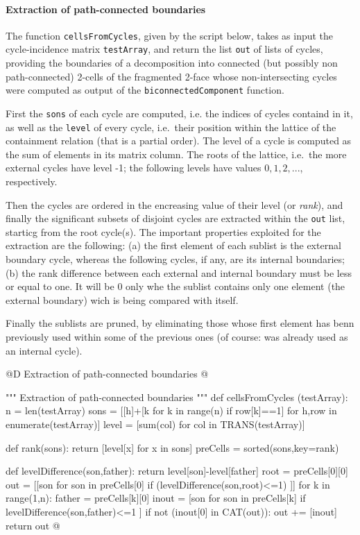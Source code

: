 \documentclass[11pt,oneside]{article}	%
\begin{document}
\paragraph{Extraction of path-connected boundaries}

The function \texttt{cellsFromCycles}, given by the script below, takes as input the cycle-incidence matrix \texttt{testArray}, and return the list \texttt{out} of lists of cycles, providing the boundaries of a decomposition into connected (but possibly non path-connected) 2-cells of the fragmented 2-face whose non-intersecting cycles were computed as output of the \texttt{biconnectedComponent} function. 

First the \texttt{sons} of each cycle are computed, i.e. the indices of cycles containd in it, as well as the \texttt{level} of every cycle, i.e.~their position within the lattice of the containment relation (that is a partial order). 
The level of a cycle is computed as the sum of elements in its matrix column. The roots of the lattice, i.e.~the more external cycles have level -1; the following levels have values $0,1,2,...$, respectively.

Then the cycles are ordered in the encreasing value of their level (or \emph{rank}), and finally the significant subsets of disjoint cycles are extracted within the \texttt{out} list, starticg from the root cycle(s). The important properties exploited for the extraction are the following: (a) the first element of each sublist is the external boundary cycle, whereas the following cycles, if any, are its internal boundaries; (b) the rank difference between each external and internal boundary must be less or equal to one. It will be 0 only whe the sublist contains only one element (the external boundary) wich is being compared with itself.

Finally the sublists are pruned, by eliminating those whose first element has benn previously used within some of the previous ones (of course: was already used as an internal cycle).

@D Extraction of path-connected boundaries
@{""" Extraction of path-connected boundaries """
def cellsFromCycles (testArray):
    n = len(testArray)
    sons = [[h]+[k for k in range(n) if row[k]==1] for h,row in enumerate(testArray)]
    level = [sum(col) for col in TRANS(testArray)]
    
    def rank(sons): return [level[x] for x in sons]
    preCells = sorted(sons,key=rank)

    def levelDifference(son,father): return level[son]-level[father]
    root = preCells[0][0]
    out = [[son for son in preCells[0] if (levelDifference(son,root)<=1) ]]
    for k in range(1,n):
        father = preCells[k][0]
        inout = [son for son in preCells[k] if levelDifference(son,father)<=1 ]
        if not (inout[0] in CAT(out)):
            out += [inout]
    return out        
@}
\end{document}

